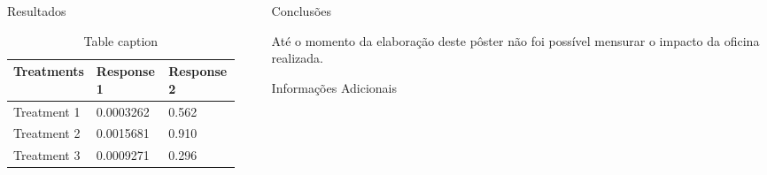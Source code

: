 \documentclass[final]{beamer}
\newlength{\sepwid}
\newlength{\onecolwid}
\newlength{\twocolwid}
\begin{document}
\begin{frame}[t]
\begin{columns}[t]
\begin{column}{\twocolwid}
\begin{columns}[t,totalwidth=\twocolwid]
\begin{column}{\onecolwid}
\begin{block}{Resultados}
\begin{table}
\vspace{2ex}
\begin{tabular}{l l l}
\toprule
\textbf{Treatments} & \textbf{Response 1} & \textbf{Response 2}\\
\midrule
Treatment 1 & 0.0003262 & 0.562 \\
Treatment 2 & 0.0015681 & 0.910 \\
Treatment 3 & 0.0009271 & 0.296 \\
\bottomrule
\end{tabular}
\caption{Table caption}
\end{table}

\end{block}


\end{column} %

\end{columns} %

\end{column} %

\begin{column}{\sepwid}\end{column} %

\begin{column}{\onecolwid} %


\begin{block}{Conclusões}

Até o momento da elaboração deste pôster não foi possível mensurar o impacto da oficina realizada.

\end{block}

\vspace{3.0cm}


\begin{block}{Informações Adicionais}


\end{block}
\end{column}
\end{columns}
\end{frame}
\end{document}
